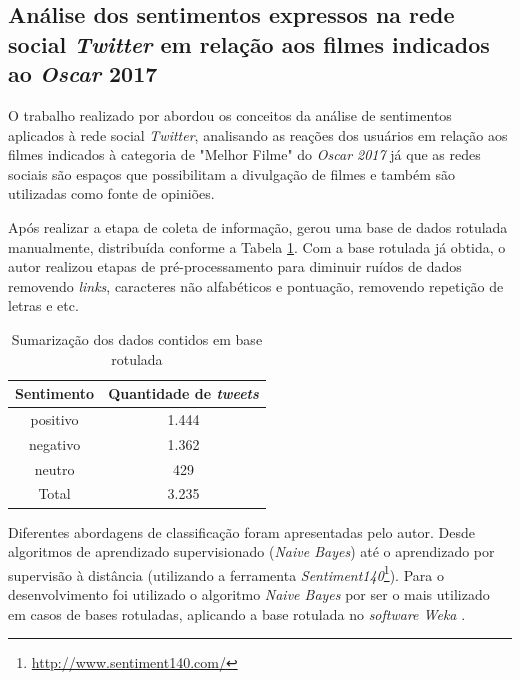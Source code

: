 \subsection{Análise dos sentimentos expressos na rede social \textit{Twitter} em relação aos filmes indicados ao \textit{Oscar} 2017}

O trabalho realizado por  abordou os conceitos da análise de sentimentos aplicados à rede social \textit{Twitter}, analisando as reações dos usuários em relação aos filmes indicados à categoria de "Melhor Filme" do \textit{Oscar 2017} já que as redes sociais são espaços que possibilitam a divulgação de filmes e também são utilizadas como fonte de opiniões. 

Após realizar a etapa de coleta de informação,  gerou uma base de dados rotulada manualmente, distribuída conforme a Tabela \ref{tab:sumarizacaocorrea}. Com a base rotulada já obtida, o autor realizou etapas de pré-processamento para diminuir ruídos de dados removendo \textit{links}, caracteres não alfabéticos e pontuação, removendo repetição de letras e etc.

\begin{table}[h!]
  \begin{center}
    \caption{Sumarização dos dados contidos em base rotulada}
    \label{tab:sumarizacaocorrea}
    
    \begin{tabular}{cc} %
      \textbf{Sentimento} & \textbf{Quantidade de \textit{tweets}}\\
      \hline
       positivo&1.444\\
       negativo&1.362\\
       neutro&429\\
      \hline
      Total&3.235
    \end{tabular}
  \end{center}
\end{table}


Diferentes abordagens de classificação foram apresentadas pelo autor. Desde algoritmos de aprendizado supervisionado (\textit{Naive Bayes}) até o aprendizado por supervisão à distância (utilizando a ferramenta \textit{Sentiment140}\footnote{\url{http://www.sentiment140.com/}}). Para o desenvolvimento foi utilizado o algoritmo \textit{Naive Bayes} por ser o mais utilizado em casos de bases rotuladas, aplicando a base rotulada no \textit{software Weka} \cite{Correa2017}. 

